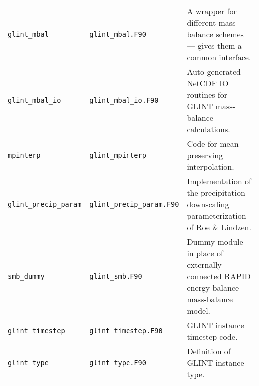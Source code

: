 \begin{center}
\begin{supertabular}{|l|l|p{7cm}|}
    \texttt{glint\_mbal} & \texttt{glint\_mbal.F90} & A wrapper for different
    mass-balance schemes --- gives them a common interface. \\
    \texttt{glint\_mbal\_io} & \texttt{glint\_mbal\_io.F90} & Auto-generated
    NetCDF IO routines for GLINT mass-balance calculations. \\
    \texttt{mpinterp} & \texttt{glint\_mpinterp} & Code for
    mean-preserving interpolation.\\
    \texttt{glint\_precip\_param} & \texttt{glint\_precip\_param.F90} & Implementation of the
    precipitation downscaling parameterization of Roe \& Lindzen. \\
    \texttt{smb\_dummy} & \texttt{glint\_smb.F90} & Dummy module in place of
    externally-connected RAPID energy-balance mass-balance model. \\
    \texttt{glint\_timestep} & \texttt{glint\_timestep.F90} & GLINT instance
    timestep code. \\
    \texttt{glint\_type} & \texttt{glint\_type.F90} & Definition of GLINT
    instance type. \\
  \end{supertabular}
\end{center}




